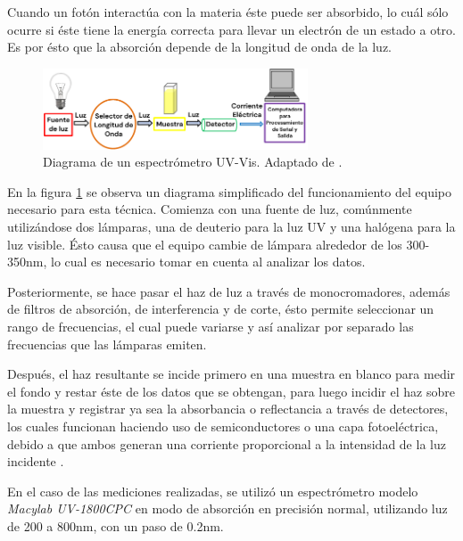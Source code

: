 \documentclass[../main.tex]{subfiles}
\begin{document}
Cuando un fotón interactúa con la materia éste puede ser absorbido, lo cuál sólo ocurre si éste tiene la energía correcta para llevar un electrón de un estado a otro. Es por ésto que la absorción depende de la longitud de onda de la luz.
\begin{figure}[H]
    \centering
    \includegraphics[width=0.7\textwidth]{fig/uvvisdiag.png}
    \caption{Diagrama de un espectrómetro UV-Vis. Adaptado de \cite{Tom2023}.}
    \label{fig:uvvisdiag}
\end{figure}
En la figura \ref{fig:uvvisdiag} se observa un diagrama simplificado del funcionamiento del equipo necesario para esta técnica. Comienza con una fuente de luz, comúnmente utilizándose dos lámparas, una de deuterio para la luz UV y una halógena para la luz visible. Ésto causa que el equipo cambie de lámpara alrededor de los 300-350nm, lo cual es necesario tomar en cuenta al analizar los datos.

Posteriormente, se hace pasar el haz de luz a través de monocromadores, además de filtros de absorción, de interferencia y de corte, ésto permite seleccionar un rango de frecuencias, el cual puede variarse y así analizar por separado las frecuencias que las lámparas emiten.

Después, el haz resultante se incide primero en una muestra en blanco para medir el fondo y restar éste de los datos que se obtengan, para luego incidir el haz sobre la muestra y registrar ya sea la absorbancia o reflectancia a través de detectores, los cuales funcionan haciendo uso de semiconductores o una capa fotoeléctrica, debido a que ambos generan una corriente proporcional a la intensidad de la luz incidente \cite{Tom2023}.

En el caso de las mediciones realizadas, se utilizó un espectrómetro modelo \textit{Macylab UV-1800CPC} en modo de absorción en precisión normal, utilizando luz de 200 a 800nm, con un paso de 0.2nm.
\end{document}
